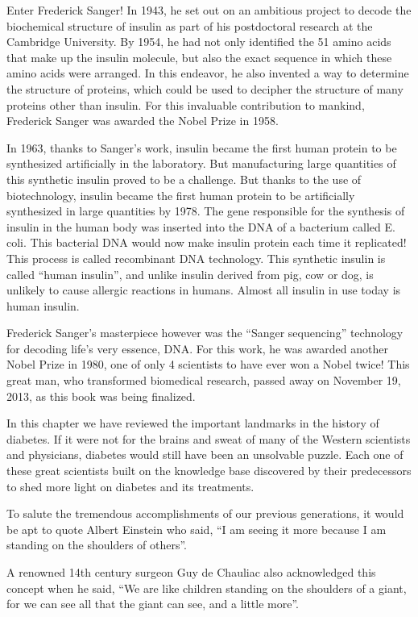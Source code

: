 Enter Frederick Sanger! In 1943, he set out on an ambitious project to decode the biochemical structure of insu\-lin as part of his postdoctoral research at the Cambridge University. By 1954, he had not only identified the 51 amino acids that make up the insulin molecule, but also the exact sequence in which these amino acids were arra\-nged. In this endeavor, he also inve\-nted a way to determine the structure of proteins, which could be used to deci\-pher the structure of many proteins other than insulin. For this invaluable contribution to mankind, Frederick Sanger was awarded the Nobel Prize in 1958.

In 1963, thanks to Sanger’s work, insulin became the first human protein to be synthesized artificially in the laboratory. But manu\-factu\-ring large quantities of this synthetic insulin proved to be a challenge. But thanks to the use of biotechnology, insulin became the first human protein to be artificially synthesized in large quantities by 1978. The gene responsible for the synthesis of insulin in the human body was inserted into the DNA of a ba\-cterium called E. coli. This bacterial DNA would now make insulin protein each time it replicated! This process is called recombinant DNA technology. This synthetic insu\-lin is called “human insulin”, and unlike insulin derived from pig, cow or dog, is unlikely to cause allergic reactions in humans. Almost all insu\-lin in use today is human insulin.

Frederick Sanger’s masterpiece however was the “Sanger seque\-ncing” technology for decoding life’s very essence, DNA. For this work, he was awarded another Nobel Prize in 1980, one of only 4 scientists to have ever won a Nobel twice! This great man, who transformed biomedical research, passed away on Nove\-mber 19, 2013, as this book was being finalized.

In this chapter we have reviewed the important landmarks in the history of diabetes. If it were not for the brains and sweat of many of the Western scientists and physicians, diabetes would still have been an unsolvable puzzle. Each one of these great scientists built on the knowledge base discovered by their predecessors to shed more light on diabetes and its treatments.

To salute the tremendous accomplishments of our previous genera\-tions, it would be apt to quote Albert Einstein who said, “I am seeing it more because I am standing on the shoulders of others”.

A renowned 14th century surgeon Guy de Chauliac also acknow\-ledged this concept when he said, “We are like children standing on the shoulders of a giant, for we can see all that the giant can see, and a little more”.


